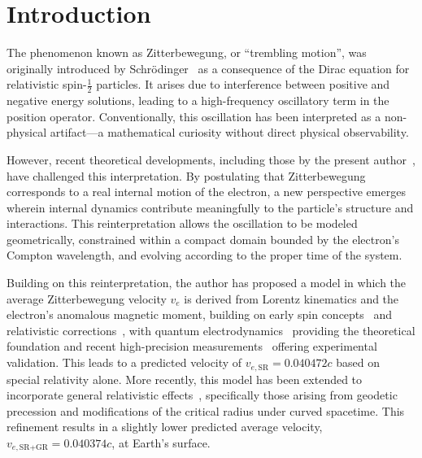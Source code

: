\documentclass[%
 reprint,
 amsmath,amssymb,
 aps,
]{revtex4-1}
\numberwithin{equation}{section}%
\begin{document}
\maketitle

\section{Introduction}

The phenomenon known as Zitterbewegung, or ``trembling motion'', was originally introduced by Schrödinger~\cite{schrodinger1930} as a consequence of the Dirac equation for relativistic spin-$\frac{1}{2}$ particles. It arises due to interference between positive and negative energy solutions, leading to a high-frequency oscillatory term in the position operator. Conventionally, this oscillation has been interpreted as a non-physical artifact—a mathematical curiosity without direct physical observability.

However, recent theoretical developments, including those by the present author~\cite{hanamura1811.0312,hanamura2006.0104}, have challenged this interpretation. By postulating that Zitterbewegung corresponds to a real internal motion of the electron, a new perspective emerges wherein internal dynamics contribute meaningfully to the particle's structure and interactions. This reinterpretation allows the oscillation to be modeled geometrically, constrained within a compact domain bounded by the electron's Compton wavelength, and evolving according to the proper time of the system.

Building on this reinterpretation, the author has proposed a model in which the average Zitterbewegung velocity $v_e$ is derived from Lorentz kinematics and the electron's anomalous magnetic moment, building on early spin concepts~\cite{uhlenbeck1925} and relativistic corrections~\cite{thomas1926}, with quantum electrodynamics~\cite{schwinger1948} providing the theoretical foundation and recent high-precision measurements~\cite{fan2023} offering experimental validation. This leads to a predicted velocity of $v_{e,\text{SR}} = 0.040472c$ based on special relativity alone. More recently, this model has been extended to incorporate general relativistic effects~\cite{einstein1916}, specifically those arising from geodetic precession and modifications of the critical radius under curved spacetime. This refinement results in a slightly lower predicted average velocity, $v_{e,\text{SR+GR}} = 0.040374c$, at Earth's surface.
\end{document}
